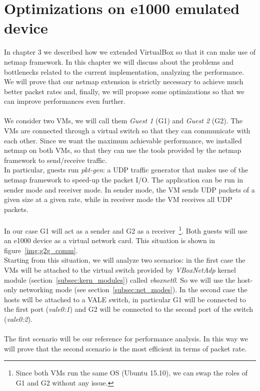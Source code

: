 \documentclass[a4paper, 12pt, titlepage]{report}
\begin{document}
\chapter{Optimizations on e1000 emulated device}
In chapter 3 we described how we extended VirtualBox so that it can make use of netmap framework. In this chapter we will discuss about the problems and bottlenecks related to the current implementation, analyzing the performance. We will prove that our netmap extension is strictly necessary to achieve much better packet rates and, finally, we will propose some optimizations so that we can improve performances even further. 
\\
\\
We consider two VMs, we will call them \textit{Guest 1} (G1) and \textit{Guest 2} (G2). The VMs are connected through a virtual switch so that they can communicate with each other. Since we want the maximum achievable performance, we installed netmap on both VMs, so that they can use the tools provided by the netmap framework to send/receive traffic.
\\
In particular, guests run \textit{pkt-gen}: a UDP traffic generator that makes use of the netmap framework to speed-up the packet I/O. The application can be run in sender mode and receiver mode. In sender mode, the VM sends UDP packets of a given size at a given rate, while in receiver mode the VM receives all UDP packets.
\\
\\
In our case G1 will act as a sender and G2 as a receiver~\footnote{Since both VMs run the same OS (Ubuntu 15.10), we can swap the roles of G1 and G2 without any issue.}. Both guests will use an e1000 device as a virtual network card. This situation is shown in figure~\ref{img:g2g_comm}.
\\
Starting from this situation, we will analyze two scenarios: in the first case the VMs will be attached to the virtual switch provided by \textit{VBoxNetAdp} kernel module (section~\ref{subsec:kern_modules}) called \textit{vboxnet0}. So we will use the host-only networking mode (see section~\ref{subsec:net_modes}). In the second case the hosts will be attached to a VALE switch, in particular G1 will be connected to the first port (\textit{vale0:1}) and G2 will be connected to the second port of the switch (\textit{vale0:2}).
\\
\\
The first scenario will be our reference for performance analysis. In this way we will prove that the second scenario is the most efficient in terms of packet rate.
\end{document}
